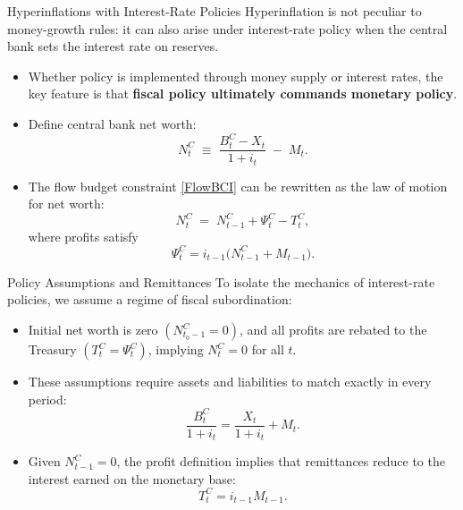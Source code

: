 \documentclass[11pt,aspectratio=169]{beamer}
\begin{document}
\begin{frame}{Hyperinflations with Interest-Rate Policies}
\small
Hyperinflation is not peculiar to money-growth rules: it can also arise under interest-rate policy when the central bank sets the interest rate on reserves.

\begin{itemize}
    \item Whether policy is implemented through money supply or interest rates, the key feature is that \textbf{fiscal policy ultimately commands monetary policy}.
    
    \item Define central bank net worth:
    \[
      N_t^{C} \;\equiv\; \frac{B_t^{C}-X_t}{1+i_t} \;-\; M_t.
    \]
    
    \item The flow budget constraint \eqref{FlowBCI} can be rewritten as the law of motion for net worth:
    \[
      N_t^{C} \;=\; N_{t-1}^{C} + \Psi_t^{C} - T_t^{C},
    \]
    where profits satisfy
    \[
      \Psi_t^{C} = i_{t-1}\bigl(N_{t-1}^{C}+M_{t-1}\bigr).
    \]
\end{itemize}
\end{frame}


\begin{frame}{Policy Assumptions and Remittances}
\small
To isolate the mechanics of interest-rate policies, we assume a regime of fiscal subordination:

\begin{itemize}
    \item Initial net worth is zero \((N_{t_{0}-1}^{C}=0)\), and all profits are rebated to the Treasury \((T_{t}^{C}=\Psi _{t}^{C})\), implying \(N_t^C = 0\) for all \(t\).
    \item These assumptions require assets and liabilities to match exactly in every period:
    \begin{equation}
    \frac{B_{t}^{C}}{1+i_{t}}=\frac{X_{t}}{1+i_{t}}+M_{t}. \label{BSCentral Bank}
    \end{equation}
    \item Given \(N_{t-1}^C = 0\), the profit definition implies that remittances reduce to the interest earned on the monetary base:
    \begin{equation*}
    T_{t}^{C}=i_{t-1}M_{t-1}.
    \end{equation*}
\end{itemize}
\end{frame}
\end{document}
